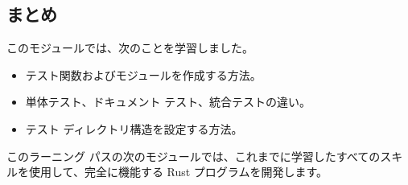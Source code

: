 \subsection{まとめ}

このモジュールでは、次のことを学習しました。

\begin{itemize}
\item テスト関数およびモジュールを作成する方法。
\item 単体テスト、ドキュメント テスト、統合テストの違い。
\item テスト ディレクトリ構造を設定する方法。
\end{itemize}

このラーニング パスの次のモジュールでは、これまでに学習したすべてのスキルを使用して、完全に機能する Rust プログラムを開発します。